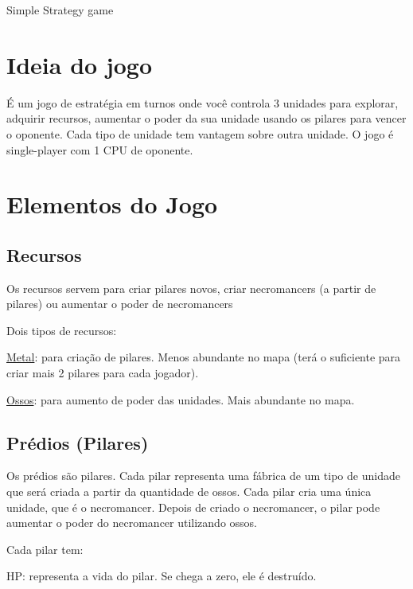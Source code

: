 Simple Strategy game

\section*{Ideia do jogo}

É um jogo de estratégia em turnos onde você controla 3 unidades para explorar, adquirir recursos, aumentar o poder da sua unidade usando os pilares para vencer o oponente. Cada tipo de unidade tem vantagem sobre outra unidade. O jogo é single-\/player com 1 C\+PU de oponente.

\section*{Elementos do Jogo}

\subsection*{Recursos}

Os recursos servem para criar pilares novos, criar necromancers (a partir de pilares) ou aumentar o poder de necromancers

Dois tipos de recursos\+:
\begin{DoxyItemize}
\item \mbox{\hyperlink{class_metal}{Metal}}\+: para criação de pilares. Menos abundante no mapa (terá o suficiente para criar mais 2 pilares para cada jogador).
\item \mbox{\hyperlink{class_ossos}{Ossos}}\+: para aumento de poder das unidades. Mais abundante no mapa.
\end{DoxyItemize}

\subsection*{Prédios (Pilares)}

Os prédios são pilares. Cada pilar representa uma fábrica de um tipo de unidade que será criada a partir da quantidade de ossos. Cada pilar cria uma única unidade, que é o necromancer. Depois de criado o necromancer, o pilar pode aumentar o poder do necromancer utilizando ossos.

Cada pilar tem\+:
\begin{DoxyItemize}
\item HP\+: representa a vida do pilar. Se chega a zero, ele é destruído.
\end{DoxyItemize}

